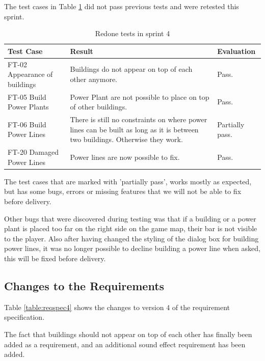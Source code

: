 	The test cases in Table \ref{table:retestssprint4} did not pass previous tests and were retested this sprint.

	\begin{table}[H]
	\begin{tabular}{| p{3cm} | p{7cm} | p{2cm} |}
		\hline
		\rowcolor{lightgray}
		{\bf Test Case} & {\bf Result} & {\bf Evaluation} \\ \hline
		
		FT-02 Appearance of buildings & Buildings do not appear on top of each other anymore. & Pass. \\ \hline
		
		FT-05 Build Power Plants & Power Plant are not possible to place on top of other buildings. & Pass. \\ \hline
		
		FT-06 Build Power Lines & There is still no constraints on where power lines can be built as long as it is between two buildings. Otherwise they work. & Partially pass. \\ \hline
		
		FT-20 Damaged Power Lines & Power lines are now possible to fix. & Pass. \\ \hline
	\end{tabular}	
	\caption{Redone tests in sprint 4}
	\label{table:retestssprint4}
	\end{table}

	The test cases that are marked with 'partially pass', works mostly as expected, but has some bugs, errors or missing features that we will not be able to fix before delivery.

	Other bugs that were discovered during testing was that if a building or a power plant is placed 
	too far on the right side on the game map, their bar is not visible to the player. Also after having 
	changed the styling of the dialog box for building power lines, it was no longer possible to decline 
	building a power line when asked, this will be fixed before delivery.

\subsection{Changes to the Requirements}

	Table \ref{table:reqspec4} shows the changes to version 4 of the requirement specification.

	The fact that buildings should not appear on top of each other has finally been added as a requirement, and an additional sound effect requirement has been added.

